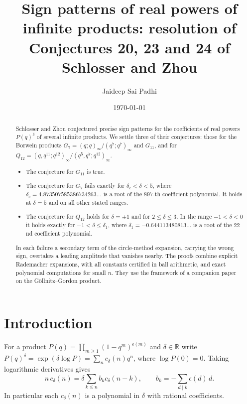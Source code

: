 \documentclass[11pt]{amsart}
\title[Sign patterns of real powers of infinite products]{Sign patterns of real powers of infinite products: resolution of Conjectures 20, 23 and 24 of Schlosser and Zhou}
\author{Jaideep Sai Padhi}
\date{\today}
\theoremstyle{remark}
\begin{document}
\begin{abstract}
Schlosser and Zhou conjectured precise sign patterns for the coefficients of real powers $P(q)^\delta$ of several infinite products. We settle three of their conjectures: those for the Borwein products $G_7=(q;q)_\infty/(q^7;q^7)_\infty$ and $G_{11}$, and for $Q_{12}=(q,q^{11};q^{12})_\infty/(q^5,q^7;q^{12})_\infty$.
\begin{itemize}[leftmargin=1.5em]
\item The conjecture for $G_{11}$ is true.
\item The conjecture for $G_7$ fails exactly for $\delta_c<\delta<5$, where $\delta_c=4.873507585386734263\ldots$ is a root of the $897$-th coefficient polynomial. It holds at $\delta=5$ and on all other stated ranges.
\item The conjecture for $Q_{12}$ holds for $\delta=\pm1$ and for $2\le\delta\le3$. In the range $-1<\delta<0$ it holds exactly for $-1<\delta\le\delta_1$, where $\delta_1=-0.644113480813\ldots$ is a root of the $22$nd coefficient polynomial.
\end{itemize}
In each failure a secondary term of the circle-method expansion, carrying the wrong sign, overtakes a leading amplitude that vanishes nearby. The proofs combine explicit Rademacher expansions, with all constants certified in ball arithmetic, and exact polynomial computations for small $n$. They use the framework of a companion paper on the G\"ollnitz--Gordon product.
\end{abstract}
\maketitle

\section{Introduction}
For a product $P(q)=\prod_{m\ge1}(1-q^m)^{\epsilon(m)}$ and $\delta\in\mathbb R$ write $P(q)^\delta=\exp(\delta\log P)=\sum_nc_\delta(n)q^n$, where $\log P(0)=0$. Taking logarithmic derivatives gives
\[
n\,c_\delta(n)=\delta\sum_{k\le n}b_kc_\delta(n-k),\qquad b_k=-\sum_{d\mid k}\epsilon(d)\,d .
\]
In particular each $c_\delta(n)$ is a polynomial in $\delta$ with rational coefficients.
\end{document}
